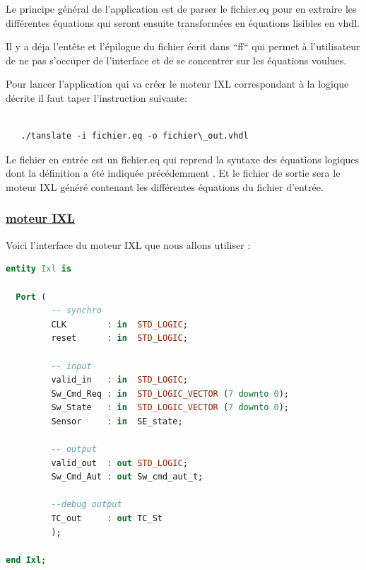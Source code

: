 \medskip

Le principe général de l'application est de parser le fichier.eq pour
en extraire les différentes équations qui seront ensuite transformées en
équations lisibles en vhdl.

\medskip

Il y a déja l'entête et l'épilogue du fichier écrit dans ``ff`` qui
permet à l'utilisateur de ne pas s'occuper de l'interface et de se
concentrer sur les équations voulues.

\medskip

Pour lancer l'application qui va créer le moteur IXL correspondant à la logique décrite il faut taper l'instruction suivante:

\begin{lstlisting}

   ./tanslate -i fichier.eq -o fichier\_out.vhdl

\end{lstlisting}




Le fichier en entrée est un fichier.eq qui reprend la syntaxe des
équations logiques dont la définition a été indiquée précédemment  \cite{}.
Et le fichier de sortie sera le moteur IXL généré contenant les
différentes équations du fichier d'entrée.

\newpage

\subsubsection{\underline{moteur IXL}}
\label{sec:IXL}

Voici l'interface du moteur IXL que nous allons utiliser :

\begin{lstlisting}[language=vhdl]
entity Ixl is  

  Port (
         -- synchro   
         CLK        : in  STD_LOGIC;
         reset      : in  STD_LOGIC;

         -- input
         valid_in   : in  STD_LOGIC; 
         Sw_Cmd_Req : in  STD_LOGIC_VECTOR (7 downto 0);
         Sw_State   : in  STD_LOGIC_VECTOR (7 downto 0);
         Sensor     : in  SE_state;
         
         -- output
         valid_out  : out STD_LOGIC;
         Sw_Cmd_Aut : out Sw_cmd_aut_t;

         --debug output
         TC_out     : out TC_St
         );

end Ixl;

\end{lstlisting}

